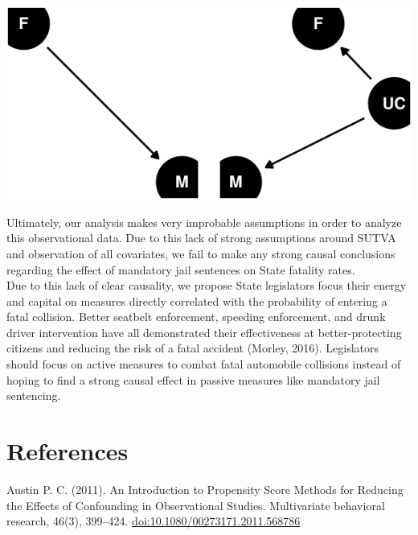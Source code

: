 \documentclass[]{article}
\let\origfigure\figure
\let\endorigfigure\endfigure
\renewenvironment{figure}[1][2] {
    \expandafter\origfigure\expandafter[H]
} {
    \endorigfigure
}
\begin{document}
\begin{figure}
\centering
\includegraphics{team6_final_project_3_files/figure-latex/dag-1.pdf}
\caption{\label{fig:dag}Directed acyclic graphs of scenarios where direction of causal inference changes. a. Violation of exogeneity. b. Violation of ignorability of unobserved confounding variables. M: mandatory jail sentence; F: vehicle fatality rate; UC: unobserved confounding variable}
\end{figure}

Ultimately, our analysis makes very improbable assumptions in order to analyze this observational data. Due to this lack of strong assumptions around SUTVA and observation of all covariates, we fail to make any strong causal conclusions regarding the effect of mandatory jail sentences on State fatality rates.\\
Due to this lack of clear causality, we propose State legislators focus their energy and capital on measures directly correlated with the probability of entering a fatal collision. Better seatbelt enforcement, speeding enforcement, and drunk driver intervention have all demonstrated their effectiveness at better-protecting citizens and reducing the risk of a fatal accident (Morley, 2016). Legislators should focus on active measures to combat fatal automobile collisions instead of hoping to find a strong causal effect in passive measures like mandatory jail sentencing.

\hypertarget{references}{%
\section{References}\label{references}}

Austin P. C. (2011). An Introduction to Propensity Score Methods for Reducing the Effects of Confounding in Observational Studies. Multivariate behavioral research, 46(3), 399--424. \url{doi:10.1080/00273171.2011.568786}
\end{document}
